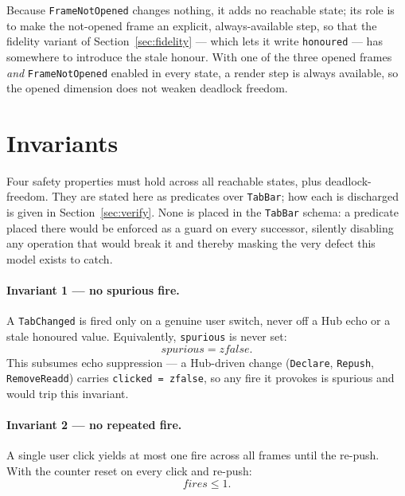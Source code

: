 \documentclass[a4paper,10pt,fleqn]{article}
\begin{document}
Because \texttt{FrameNotOpened} changes nothing, it adds no reachable state; its
role is to make the not-opened frame an explicit, always-available step, so that
the fidelity variant of Section~\ref{sec:fidelity} --- which lets it write
\texttt{honoured} --- has somewhere to introduce the stale honour.  With one of
the three opened frames \emph{and} \texttt{FrameNotOpened} enabled in every
state, a render step is always available, so the opened dimension does not
weaken deadlock freedom.

\section{Invariants}
\label{sec:inv}

Four safety properties must hold across all reachable states, plus
deadlock-freedom.  They are stated here as predicates over \texttt{TabBar};
how each is discharged is given in Section~\ref{sec:verify}.  None is placed in
the \texttt{TabBar} schema: a predicate placed there would be enforced as a
guard on every successor, silently disabling any operation that would break it
and thereby masking the very defect this model exists to catch.

\paragraph{Invariant 1 --- no spurious fire.}
A \texttt{TabChanged} is fired only on a genuine user switch, never off a Hub
echo or a stale honoured value.  Equivalently, \texttt{spurious} is never set:
\[
  spurious = zfalse.
\]
This subsumes echo suppression --- a Hub-driven change (\texttt{Declare},
\texttt{Repush}, \texttt{RemoveReadd}) carries \texttt{clicked = zfalse}, so
any fire it provokes is spurious and would trip this invariant.

\paragraph{Invariant 2 --- no repeated fire.}
A single user click yields at most one fire across all frames until the
re-push.  With the counter reset on every click and re-push:
\[
  fires \leq 1.
\]
\end{document}

